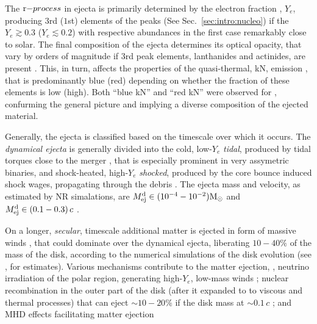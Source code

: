 The $\rproc{}$ \nuc{} in ejecta is primarily determined by the electron fraction \cite{137}, $Y_e$, 
producing $3$rd ($1$st) elements of the \rproc{} peaks (See Sec.~\ref{sec:intro:nucleo}) 
if the $Y_e{\gtrsim}0.3$ ($Y_e{\lesssim}0.2$) with respective abundances in the first case 
remarkably close to solar. 
The final composition of the ejecta determines its optical opacity, that vary by orders of 
magnitude if $3$rd peak elements, lanthanides and actinides, are present \cite{138,139}.
This, in turn, affects the properties of the quasi-thermal, \ac{kN}, emission \cite{25}, that is 
predominantly blue (red) depending on whether the fraction of these elements is low (high).
Both ``blue \ac{kN}'' and ``red \ac{kN}'' were observed for \GW{}, confurming the general 
picture and implying a diverse composition of the ejected material.

Generally, the ejecta is classified based on the timescale over which it occurs. 
The \textit{dynamical ejecta} is generally divided into 
the cold, low-$Y_e$ \textit{tidal}, produced by tidal torques close to the merger 
\cite{119,140,134}, that 
is especially prominent in very assymetric binaries, and shock-heated, high-$Y_e$
\textit{shocked}, produced 
by the core bounce induced shock wages, propagating through the \pmerg{} debris 
\cite{120, 121, 18, 134, 122}. The ejecta mass and velocity, as estimated by \ac{NR} 
simalations, are $M^{\text{d}}_{\text{ej}}\in(10^{-4}-10^{-2}){\text{M}_{\odot}}$ and $M^{\text{d}}_{\text{ej}}\in(0.1-0.3)\,c$ 
\cite{120,121,18,122}.

On a longer, \textit{secular}, timescale additional matter is ejected in form of 
massive winds \cite{123, 84, 24, 124, 21, 78, 81, 141}, that could dominate over the 
dynamical ejecta, liberating $10-40\%$ of the mass of the disk, 
according to the numerical simulations of the disk evolution (see \eg, \cite{122} for estimates).
Various mechanisms contribute to the matter ejection, \eg, 
neutrino irradiation of the polar region, generating high-$Y_e$, low-mass winds \cite{84,81}; 
nuclear recombination in the outer part of the disk (after it expanded to to viscous 
and thermal processes) that can eject ${\sim}10-20\%$ if the disk mass at ${\sim}0.1\,c$ \cite{123,24,142};
and \ac{MHD} effects facilitating matter ejection \cite{21,72,141}

